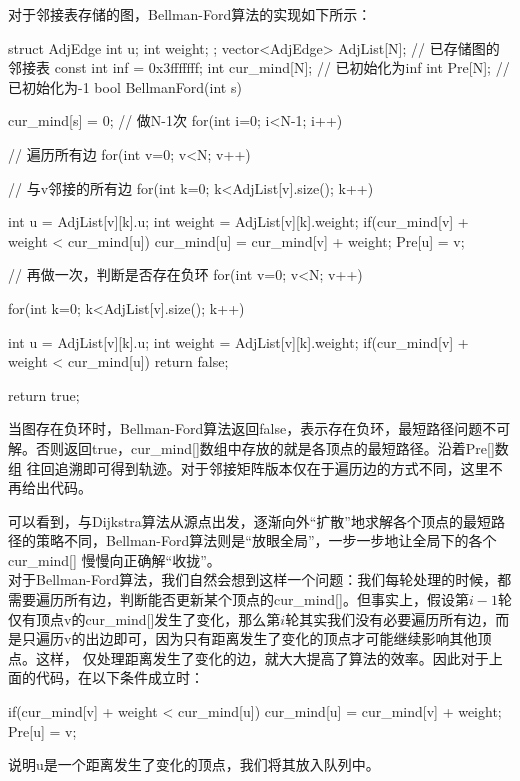 对于邻接表存储的图，Bellman-Ford算法的实现如下所示：
\begin{cppcode}
    struct AdjEdge {
        int u;
        int weight;
    };
    vector<AdjEdge> AdjList[N]; // 已存储图的邻接表
    const int inf = 0x3fffffff;
    int cur_mind[N];    // 已初始化为inf
    int Pre[N];     // 已初始化为-1
    bool BellmanFord(int s) {
        cur_mind[s] = 0;
        // 做N-1次
        for(int i=0; i<N-1; i++) {
            // 遍历所有边
            for(int v=0; v<N; v++) {
                // 与v邻接的所有边
                for(int k=0; k<AdjList[v].size(); k++) {
                    int u = AdjList[v][k].u;
                    int weight = AdjList[v][k].weight;
                    if(cur_mind[v] + weight < cur_mind[u]) {
                        cur_mind[u] = cur_mind[v] + weight;
                        Pre[u] = v;
                    }

                }
            }
        }

        // 再做一次，判断是否存在负环
        for(int v=0; v<N; v++) {
            for(int k=0; k<AdjList[v].size(); k++) {
                int u = AdjList[v][k].u;
                int weight = AdjList[v][k].weight;
                if(cur_mind[v] + weight < cur_mind[u]) {
                    return false;
                }

            }
        }
        return true;
    }
\end{cppcode}
当图存在负环时，Bellman-Ford算法返回false，表示存在负环，最短路径问题不可解。否则返回true，cur\_mind[]数组中存放的就是各顶点的最短路径。沿着Pre[]数组
往回追溯即可得到轨迹。对于邻接矩阵版本仅在于遍历边的方式不同，这里不再给出代码。

可以看到，与Dijkstra算法从源点出发，逐渐向外“扩散”地求解各个顶点的最短路径的策略不同，Bellman-Ford算法则是“放眼全局”，一步一步地让全局下的各个cur\_mind[]
慢慢向正确解“收拢”。\\

对于Bellman-Ford算法，我们自然会想到这样一个问题：我们每轮处理的时候，都需要遍历所有边，判断能否更新某个顶点的cur\_mind[]。但事实上，假设第$i-1$轮
仅有顶点v的cur\_mind[]发生了变化，那么第$i$轮其实我们没有必要遍历所有边，而是只遍历v的出边即可，因为只有距离发生了变化的顶点才可能继续影响其他顶点。这样，
仅处理距离发生了变化的边，就大大提高了算法的效率。因此对于上面的代码，在以下条件成立时：
\begin{cppcode}
    if(cur_mind[v] + weight < cur_mind[u]) {
        cur_mind[u] = cur_mind[v] + weight;
        Pre[u] = v;
    }
\end{cppcode}
说明u是一个距离发生了变化的顶点，我们将其放入队列中。

